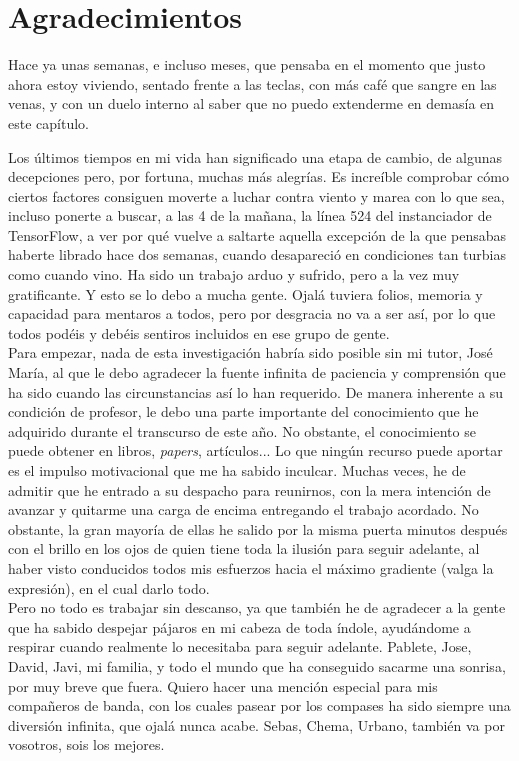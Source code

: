 \chapter*{Agradecimientos}

Hace ya unas semanas, e incluso meses, que pensaba en el momento que justo ahora estoy viviendo, sentado frente a las teclas, con más café que sangre en las venas, y con un duelo interno al saber que no puedo extenderme en demasía en este capítulo.

Los últimos tiempos en mi vida han significado una etapa de cambio, de algunas decepciones pero, por fortuna, muchas más alegrías. Es increíble comprobar cómo ciertos factores consiguen moverte a luchar contra viento y marea con lo que sea, incluso ponerte a buscar, a las 4 de la mañana, la línea 524 del instanciador de TensorFlow, a ver por qué vuelve a saltarte aquella excepción de la que pensabas haberte librado hace dos semanas, cuando desapareció en condiciones tan turbias como cuando vino. Ha sido un trabajo arduo y sufrido, pero a la vez muy gratificante. Y esto se lo debo a mucha gente. Ojalá tuviera folios, memoria y capacidad para mentaros a todos, pero por desgracia no va a ser así, por lo que todos podéis y debéis sentiros incluidos en ese grupo de gente.\\


Para empezar, nada de esta investigación habría sido posible sin mi tutor, José María, al que le debo agradecer la fuente infinita de paciencia y comprensión que ha sido cuando las circunstancias así lo han requerido. De manera inherente a su condición de profesor, le debo una parte importante del conocimiento que he adquirido durante el transcurso de este año. No obstante, el conocimiento se puede obtener en libros, \emph{papers}, artículos... Lo que ningún recurso puede aportar es el impulso motivacional que me ha sabido inculcar. Muchas veces, he de admitir que he entrado a su despacho para reunirnos, con la mera intención de avanzar y quitarme una carga de encima entregando el trabajo acordado. No obstante, la gran mayoría de ellas he salido por la misma puerta minutos después con el brillo en los ojos de quien tiene toda la ilusión para seguir adelante, al haber visto conducidos todos mis esfuerzos hacia el máximo gradiente (valga la expresión), en el cual darlo todo.\\

Pero no todo es trabajar sin descanso, ya que también he de agradecer a la gente que ha sabido despejar pájaros en mi cabeza de toda índole, ayudándome a respirar cuando realmente lo necesitaba para seguir adelante. Pablete, Jose, David, Javi, mi familia, y todo el mundo que ha conseguido sacarme una sonrisa, por muy breve que fuera. Quiero hacer una mención especial para mis compañeros de banda, con los cuales pasear por los compases ha sido siempre una diversión infinita, que ojalá nunca acabe. Sebas, Chema, Urbano, también va por vosotros, sois los mejores.\\

